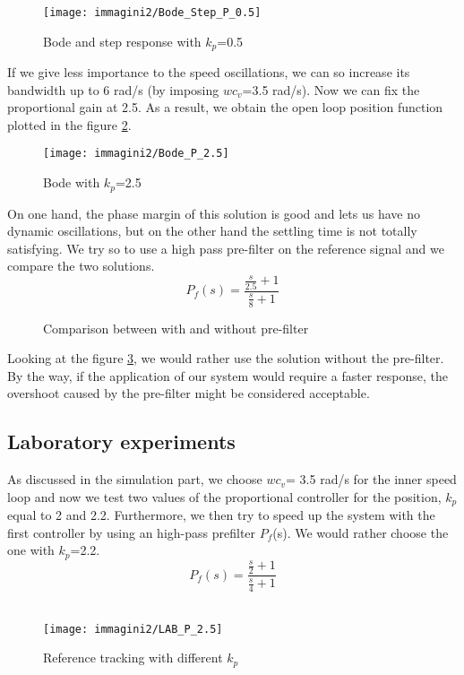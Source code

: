 \begin{figure}[h]
	\centering
	\texttt{[image: immagini2/Bode\_Step\_P\_0.5]}
	\caption{Bode and step response with $k_{p}$=0.5}
	\label{fig:Bode_P_0.5}
\end{figure}

If we give less importance to the speed oscillations, we can so increase its bandwidth up to 6 rad/s (by imposing $wc_{v}$=3.5 rad/s). Now we can fix the proportional gain at 2.5. As a result, we obtain the  open loop position function plotted in the figure \ref{fig:Bode_P_2.5}.

\begin{figure}[h]
	\centering
	\texttt{[image: immagini2/Bode\_P\_2.5]}
	\caption{Bode  with $k_{p}$=2.5}
	\label{fig:Bode_P_2.5}
\end{figure}

On one hand, the phase margin of this solution is good and lets us have no dynamic oscillations, but on the other hand the settling time is not totally satisfying. We try so to use a high pass pre-filter on the reference signal and we compare the two solutions.
\[
P_{f}(s)=\frac{\frac{s}{2.5}+1}{\frac{s}{8}+1}
\]

\begin{figure}[h]
	\centering
	\caption{Comparison between with and without pre-filter}
	\label{fig:Comp_P}
\end{figure}

Looking at the figure \ref{fig:Comp_P}, we would rather use the solution without the pre-filter. By the way, if the application of our system would require a faster response, the overshoot caused by the pre-filter might be considered acceptable.
\subsection{Laboratory experiments}
As discussed in the simulation part, we choose $wc_{v}$= 3.5 rad/s for the inner speed loop and now we test two values of the proportional controller for the position, $k_{p}$ equal to 2 and 2.2.
Furthermore, we then try to speed up the system with the first controller by using an high-pass prefilter $P_{f}$(s).  We would rather choose the one with $k_{p}$=2.2. 
\[
P_{f}(s)=\frac{\frac{s}{2}+1}{\frac{s}{4}+1}
\]
\\

\begin{figure}[h]
	\centering
	\texttt{[image: immagini2/LAB\_P\_2.5]}
	\caption{Reference tracking with different $k_{p}$}
\end{figure}

